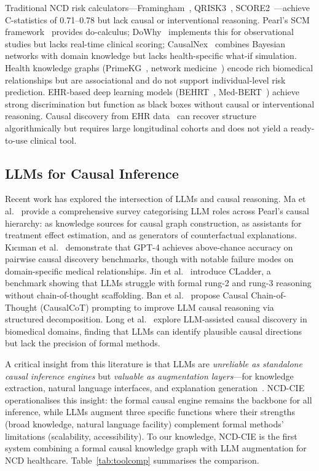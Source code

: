 \documentclass[runningheads]{llncs}
\begin{document}
Traditional NCD risk calculators---Framingham~\cite{dagostino2008},
QRISK3~\cite{hippisley2017qrisk3}, SCORE2~\cite{score22021}---achieve
C-statistics of 0.71--0.78 but lack causal or interventional reasoning.
Pearl's SCM framework~\cite{pearl2009causality} provides do-calculus;
DoWhy~\cite{sharma2020dowhy} implements this for observational studies
but lacks real-time clinical scoring;
CausalNex~\cite{beaumont2021causalnex} combines Bayesian networks
with domain knowledge but lacks health-specific what-if simulation.
Health knowledge graphs (PrimeKG~\cite{chandak2023primekg},
network medicine~\cite{barabasi2011network}) encode rich biomedical
relationships but are associational and do not support
individual-level risk prediction.
EHR-based deep learning models (BEHRT~\cite{li2020behrt},
Med-BERT~\cite{rasmy2021medbert}) achieve strong discrimination
but function as black boxes without causal or interventional
reasoning.
Causal discovery from EHR data~\cite{prosperi2020causal} can
recover structure algorithmically but requires large longitudinal
cohorts and does not yield a ready-to-use clinical tool.

\subsection{LLMs for Causal Inference}\label{sec:llmcausal}

Recent work has explored the intersection of LLMs and causal
reasoning.
Ma et al.~\cite{ma2024causal} provide a comprehensive survey
categorising LLM roles across Pearl's causal hierarchy:
as knowledge sources for causal graph construction,
as assistants for treatment effect estimation, and as generators
of counterfactual explanations.
K{\i}c{\i}man et al.~\cite{kiciman2023causal} demonstrate that
GPT-4 achieves above-chance accuracy on pairwise causal discovery
benchmarks, though with notable failure modes on domain-specific
medical relationships.
Jin et al.~\cite{jin2023cladder} introduce CLadder, a benchmark
showing that LLMs struggle with formal rung-2 and rung-3 reasoning
without chain-of-thought scaffolding.
Ban et al.~\cite{ban2023causalcot} propose Causal Chain-of-Thought
(CausalCoT) prompting to improve LLM causal reasoning via
structured decomposition.
Long et al.~\cite{long2023causal} explore LLM-assisted causal
discovery in biomedical domains, finding that LLMs can identify
plausible causal directions but lack the precision of formal
methods.

A critical insight from this literature is that LLMs are
\emph{unreliable as standalone causal inference engines} but
\emph{valuable as augmentation layers}---for knowledge extraction,
natural language interfaces, and explanation
generation~\cite{ma2024causal}.
NCD-CIE operationalises this insight: the formal causal engine
remains the backbone for all inference, while LLMs augment three
specific functions where their strengths (broad knowledge, natural
language facility) complement formal methods' limitations
(scalability, accessibility).
To our knowledge, NCD-CIE is the first system combining a formal
causal knowledge graph with LLM augmentation for NCD healthcare.
Table~\ref{tab:toolcomp} summarises the comparison.
\end{document}
